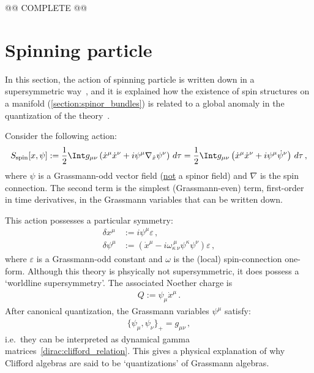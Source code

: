     @@ COMPLETE @@

\section{Spinning particle}

    In this section, the action of spinning particle is written down in a supersymmetric way~\citep{berezin_particle_1977}, and it is explained how the existence of spin structures on a manifold (\cref{section:spinor_bundles}) is related to a global anomaly in the quantization of the theory~\citep{witten_global_1985}.

    Consider the following action:
    \begin{gather}
        S_{\text{spin}}[x,\psi] := \frac{1}{2}\Int g_{\mu\nu}\left(\dot{x}^\mu\dot{x}^\nu + i\psi^\mu\nabla_{\dot{x}}\psi^\nu\right)\,d\tau = \frac{1}{2}\Int g_{\mu\nu}\left(\dot{x}^\mu\dot{x}^\nu + i\psi^\mu\dot{\psi}^\nu\right)\,d\tau\,,
    \end{gather}
    where $\psi$ is a Grassmann-odd vector field (\underline{not} a spinor field) and $\nabla$ is the spin connection. The second term is the simplest (Grassmann-even) term, first-order in time derivatives, in the Grassmann variables that can be written down.

    This action possesses a particular symmetry:
    \begin{align}
        \delta x^\mu &:= i\psi^\mu\varepsilon\,,\\
        \delta\psi^\mu &:= \left(\dot{x}^\mu - i\omega^{\ \mu\ }_{\kappa\ \nu}\psi^\kappa\psi^\nu\right)\varepsilon\,,
    \end{align}
    where $\varepsilon$ is a Grassmann-odd constant and $\omega$ is the (local) spin-connection one-form. Although this theory is phsyically not supersymmetric, it does possess a `worldline supersymmetry'. The associated Noether charge is
    \begin{gather}
        Q := \psi_\mu\dot{x}^\mu\,.
    \end{gather}
    After canonical quantization, the Grassmann variables $\psi^\mu$ satisfy:
    \begin{gather}
        \{\psi_\mu,\psi_\nu\}_+ = g_{\mu\nu}\,,
    \end{gather}
    i.e.~they can be interpreted as dynamical gamma matrices~\eqref{dirac:clifford_relation}. This gives a physical explanation of why Clifford algebras are said to be `quantizations' of Grassmann algebras.

